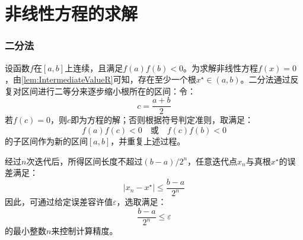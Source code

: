 \section{非线性方程的求解}

\subsubsection{二分法}
\begin{method}
	设函数$f$在$[a,b]$上连续，且满足$f(a)f(b)<0$。为求解非线性方程$f(x)=0$，由\cref{lem:IntermediateValueR}可知，存在至少一个根$x^{\star}\in(a,b)$。二分法通过反复对区间进行二等分来逐步缩小根所在的区间：令：
	\begin{equation*}
		c=\frac{a+b}{2}
	\end{equation*}
	若$f(c)=0$，则$c$即为方程的解；否则根据符号判定准则，取满足：
	\begin{equation*}
		f(a)f(c)<0\quad\text{或}\quad f(c)f(b)<0
	\end{equation*}
	的子区间作为新的区间$[a,b]$，并重复上述过程。\par
	经过$n$次迭代后，所得区间长度不超过$(b-a)/2^n$，任意迭代点$x_n$与真根$x^{\star}$的误差满足：
	\begin{equation*}
		|x_n-x^{\star}|\leqslant\frac{b-a}{2^n}
	\end{equation*}
	因此，可通过给定误差容许值$\varepsilon$，选取满足：
	\begin{equation*}
		\frac{b-a}{2^n}\leqslant\varepsilon
	\end{equation*}
	的最小整数$n$来控制计算精度。
\end{method}
